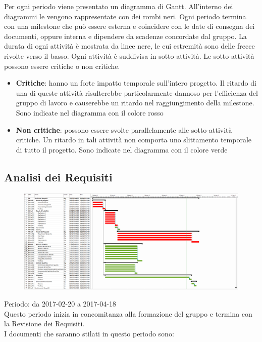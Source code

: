 Per ogni periodo viene presentato un diagramma di Gantt.
All'interno dei diagrammi le  vengono rappresentate con dei rombi neri.
Ogni periodo termina con una milestone che può essere esterna e coincidere con le
date di consegna dei documenti, oppure interna e dipendere da scadenze concordate
dal gruppo.
La durata di ogni attività è mostrata da linee nere, le cui estremità sono
delle frecce rivolte verso il basso. Ogni attività è suddivisa in sotto-attività.
Le sotto-attività possono essere critiche o non critiche.

\begin{itemize}
\item \textbf{Critiche}: hanno un forte impatto temporale sull’intero progetto.
  Il ritardo di una di queste attività risulterebbe particolarmente dannoso per
  l’efficienza del gruppo di lavoro e causerebbe un ritardo nel raggiungimento della
  milestone.
  Sono indicate nel diagramma con il colore rosso
\item \textbf{Non critiche}: possono essere svolte parallelamente alle sotto-attività critiche.
  Un ritardo in tali attività non comporta uno slittamento temporale di tutto il progetto.
  Sono indicate nel diagramma con il colore verde
\end{itemize}

\subsection{Analisi dei Requisiti}

\begin{figure}
  \centering
  \includegraphics[scale=0.28]{img/1-AR.png}
\end{figure}

Periodo: da 2017-02-20 a 2017-04-18 \\
Questo periodo inizia in concomitanza alla formazione del gruppo e termina con la Revisione dei Requisiti.\\
I documenti che saranno stilati in questo periodo sono:

